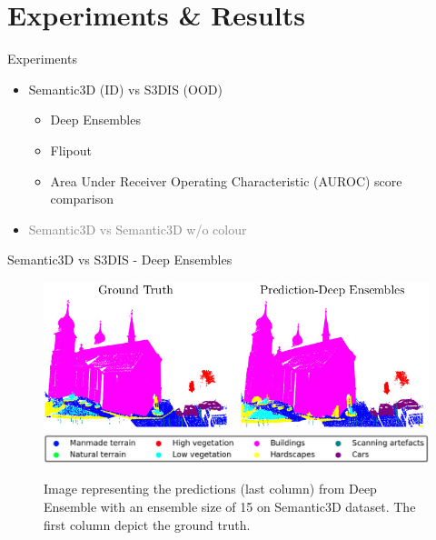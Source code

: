 \documentclass[aspectratio=169]{beamer}
\begin{document}
\section{Experiments \& Results}
\begin{frame}[noframenumbering]{Experiments}
    \begin{itemize}
        \item Semantic3D (ID) vs S3DIS (OOD)
        \begin{itemize}
            \item Deep Ensembles
            \item Flipout
            \item Area Under Receiver Operating Characteristic (AUROC) score comparison
        \end{itemize}
        \item \textcolor{gray}{Semantic3D vs Semantic3D w/o colour}
    \end{itemize}
\end{frame}
\begin{frame}{Semantic3D vs S3DIS - Deep Ensembles}
    \begin{figure}
        \centering
        \includegraphics[scale=0.5]{images/sem3d/Sem3d_DE_output.jpg}
        \includegraphics[scale=0.25]{images/legend.jpg}
        \caption{Image representing the predictions (last column) from Deep Ensemble with an ensemble size
        of 15 on Semantic3D dataset. The first column depict the ground truth.}
        \label{fig:sem3d_de_op}
    \end{figure}
\end{frame}
\end{document}
